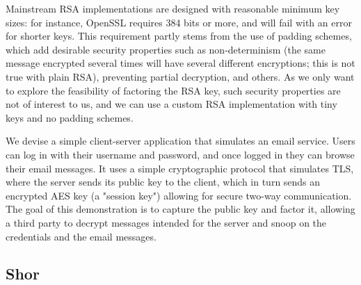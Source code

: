 \documentclass[conference]{IEEEtran}
\begin{document}
Mainstream RSA implementations are designed with reasonable minimum key sizes: for instance, OpenSSL requires 384 bits or more, and will fail with an error for shorter keys. This requirement partly stems from the use of padding schemes, which add desirable security properties such as non-determinism (the same message encrypted several times will have several different encryptions; this is not true with plain RSA), preventing partial decryption, and others. As we only want to explore the feasibility of factoring the RSA key, such security properties are not of interest to us, and we can use a custom RSA implementation with tiny keys and no padding schemes.

We devise a simple client-server application that simulates an email service. Users can log in with their username and password, and once logged in they can browse their email messages. It uses a simple cryptographic protocol that simulates TLS, where the server sends its public key to the client, which in turn sends an encrypted AES key (a "session key") allowing for secure two-way communication. The goal of this demonstration is to capture the public key and factor it, allowing a third party to decrypt messages intended for the server and snoop on the credentials and the email messages.

\subsection{Shor}





\end{document}
